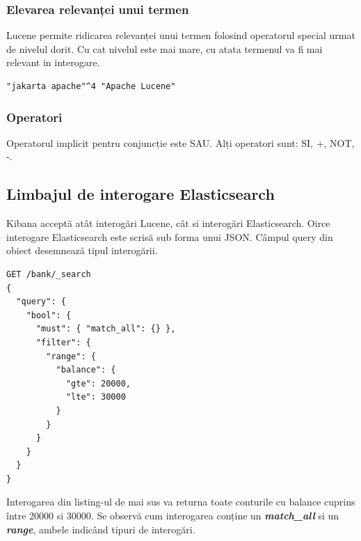 \documentclass[a4paper, 12pt, twoside]{report}
\begin{document}
	\subsubsection{Elevarea relevanței unui termen}
Lucene permite ridicarea relevanței unui termen folosind operatorul special urmat de nivelul dorit. Cu cat nivelul este mai mare, cu atata termenul va fi mai relevant in interogare.
\begin{lstlisting}[caption={elevarea relevanței - Lucene query},captionpos=b]
"jakarta apache"^4 "Apache Lucene"
\end{lstlisting}

	\subsubsection{Operatori}
Operatorul implicit pentru conjuncție este SAU. Alți operatori sunt: SI, +, NOT, -.

	\subsection{Limbajul de interogare Elasticsearch}

Kibana acceptă atât interogări Lucene, cât si interogări Elasticsearch. Oirce interogare Elasticsearch este scrisă sub forma unui JSON. Câmpul query din obiect desemnează tipul interogării.
 
\begin{lstlisting}[caption={exemplu interogare Elasticsearch - JSON},captionpos=b]
GET /bank/_search
{
  "query": {
    "bool": {
      "must": { "match_all": {} },
      "filter": {
        "range": {
          "balance": {
            "gte": 20000,
            "lte": 30000
          }
        }
      }
    }
  }
}
\end{lstlisting}

Interogarea din listing-ul de mai sus va returna toate conturile cu balance cuprins între 20000 si 30000. Se observă cum interogarea conține un {\textbf{\textit{match\_all}}} si un \textbf{\textit{range}}, ambele indicând tipuri de interogări.
\end{document}
